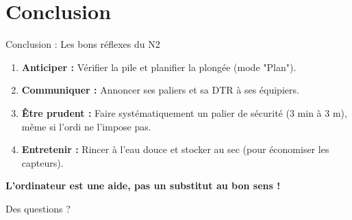 \section{Conclusion}

\begin{frame}{Conclusion : Les bons réflexes du N2}
    \begin{enumerate}
        \item \textbf{Anticiper :} Vérifier la pile et planifier la plongée (mode "Plan").
        \item \textbf{Communiquer :} Annoncer ses paliers et sa DTR à ses équipiers.
        \item \textbf{Être prudent :} Faire systématiquement un palier de sécurité (3 min à 3 m), même si l'ordi ne l'impose pas.
        \item \textbf{Entretenir :} Rincer à l'eau douce et stocker au sec (pour économiser les capteurs).
    \end{enumerate}
    \vspace{0.4cm}
    \centering \textbf{L'ordinateur est une aide, pas un substitut au bon sens !}
\end{frame}

\begin{frame}
    \centering
    \Huge{Des questions ?}
\end{frame}
